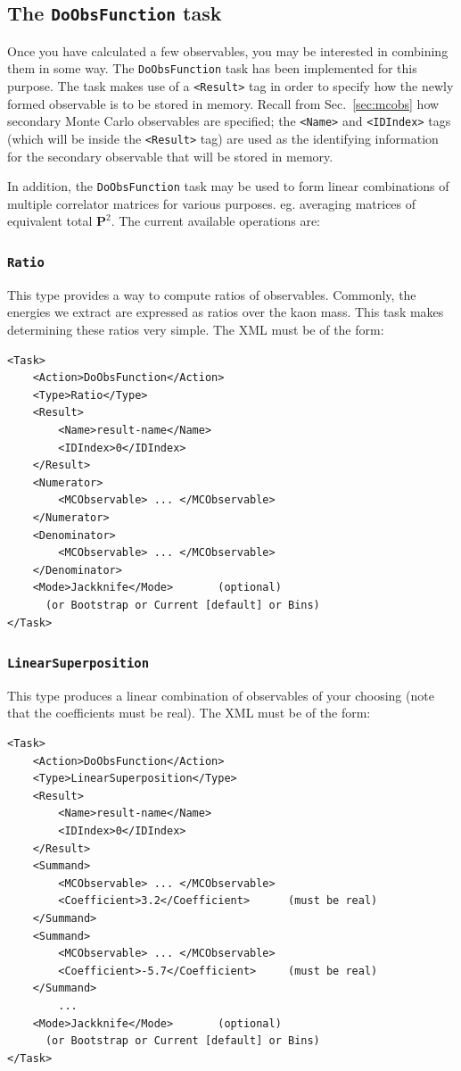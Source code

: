 \documentclass[12pt]{article}
\newcommand{\vb}{\texttt}
\begin{document}
\subsection{The \vb{DoObsFunction} task}

Once you have calculated a few observables, you may be interested in combining them in some way.
The \vb{DoObsFunction} task has been implemented for this purpose.
The task makes use of a \vb{<Result>} tag in order to specify how
the newly formed observable is to be stored in memory.
Recall from Sec.~\ref{sec:mcobs}
how secondary Monte Carlo observables are specified; the \vb{<Name>}
and \vb{<IDIndex>} tags (which will be inside the \vb{<Result>} tag)
are used as the identifying information
for the secondary observable that will be stored in memory.

In addition, the \vb{DoObsFunction} task may be used to form linear combinations of multiple
correlator matrices for various purposes. eg. averaging matrices of equivalent total $\bm{P}^2$.
The current available operations are:

\subsubsection{\vb{Ratio}}
This type provides a way to compute ratios of observables. Commonly,
the energies we extract are expressed as ratios over the kaon mass. This task makes
determining these ratios very simple.
The XML must be of the form:
\begin{verbatim}
<Task>
    <Action>DoObsFunction</Action>
    <Type>Ratio</Type>
    <Result>
        <Name>result-name</Name>
        <IDIndex>0</IDIndex>
    </Result>
    <Numerator>
        <MCObservable> ... </MCObservable>
    </Numerator>
    <Denominator>
        <MCObservable> ... </MCObservable>
    </Denominator>
    <Mode>Jackknife</Mode>       (optional)
      (or Bootstrap or Current [default] or Bins)
</Task>
\end{verbatim}
\subsubsection{\vb{LinearSuperposition}}
This type produces a linear combination
of observables of your choosing (note that the coefficients must be real).
The XML must be of the form:
\begin{verbatim}
<Task>
    <Action>DoObsFunction</Action>
    <Type>LinearSuperposition</Type>
    <Result>
        <Name>result-name</Name>
        <IDIndex>0</IDIndex>
    </Result>
    <Summand>
        <MCObservable> ... </MCObservable>
        <Coefficient>3.2</Coefficient>      (must be real)
    </Summand>
    <Summand>
        <MCObservable> ... </MCObservable>
        <Coefficient>-5.7</Coefficient>     (must be real)
    </Summand>
        ...
    <Mode>Jackknife</Mode>       (optional)
      (or Bootstrap or Current [default] or Bins)
</Task>
\end{verbatim}
\end{document}
